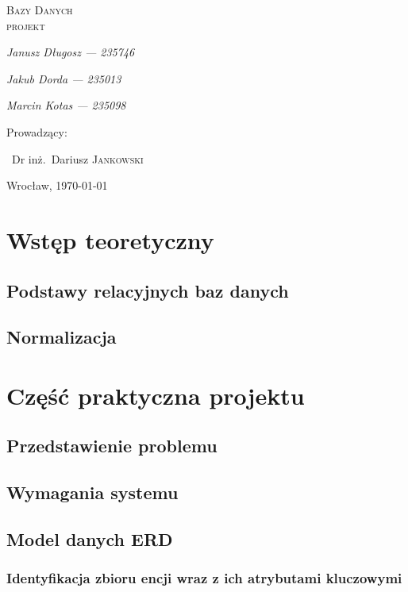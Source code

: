 \documentclass[polish, 11pt]{article}
\begin{document}
\begin{titlepage}
    \centering
    {\scshape\LARGE Bazy Danych\\ projekt \par}
    \vspace{1cm}
   
    {\itshape\Large Janusz Długosz --- 235746\/\par}
    {\itshape\Large Jakub Dorda --- 235013\/\par}
    {\itshape\Large Marcin Kotas --- 235098\/\par}
    \vfill
    Prowadzący:\par
    ~Dr inż.~Dariusz \textsc{Jankowski}

    \vfill

    {\large Wrocław, \today\par}

\end{titlepage}

\tableofcontents
\newpage

\section{Wstęp teoretyczny}
    \subsection{Podstawy relacyjnych baz danych}

    \subsection{Normalizacja}

\section{Część praktyczna projektu}
    \subsection{Przedstawienie problemu}

    \subsection{Wymagania systemu}
    
    \subsection{Model danych ERD}
		\subsubsection{Identyfikacja zbioru encji wraz z ich atrybutami kluczowymi}
	    
\end{document}
